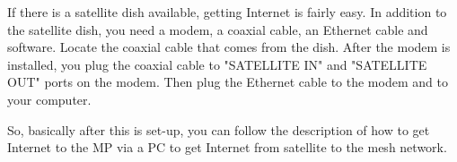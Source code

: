 If there is a satellite dish available, getting Internet is fairly easy. In addition to the satellite dish, you need a modem, a coaxial cable, an Ethernet cable and software. Locate the coaxial cable that comes from the dish. After the modem is installed, you plug the coaxial cable to "SATELLITE IN" and "SATELLITE OUT" ports on the modem. Then plug the Ethernet cable to the modem and to your computer. 

So, basically after this is set-up, you can follow the description of how to get Internet to the MP via a PC to get Internet from satellite to the mesh network. 
